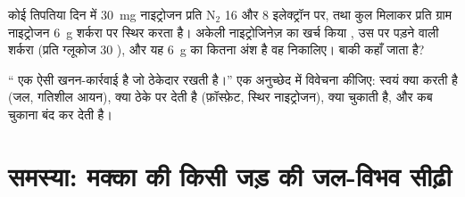 \begin{exercise}[$\star\star\star$]\label{exo:b1:plant-water-minerals:11}
कोई तिपतिया दिन में \qty{30}{mg} नाइट्रोजन प्रति $\mathrm{N_2}$
\qty{16}{}  और \qty{8}{} इलेक्ट्रॉन पर, तथा कुल मिलाकर प्रति ग्राम
नाइट्रोजन \qty{6}{g} शर्करा पर स्थिर करता है। अकेली नाइट्रोजिनेज़ का
खर्च किया , उस पर पड़ने वाली शर्करा (प्रति ग्लूकोज 30 ), और यह
\qty{6}{g} का कितना अंश है वह निकालिए। बाकी कहाँ जाता है?
\end{exercise}

\begin{exercise}[$\star\star\star$]\label{exo:b1:plant-water-minerals:12}
`` एक ऐसी खनन-कार्रवाई है जो ठेकेदार रखती है।'' एक अनुच्छेद में
विवेचना कीजिए:  स्वयं क्या करती है (जल, गतिशील आयन), क्या ठेके पर
देती है (फ़ॉस्फ़ेट, स्थिर नाइट्रोजन), क्या चुकाती है, और कब चुकाना बंद
कर देती है।
\end{exercise}

\section{समस्या: मक्का की किसी जड़ की जल-विभव सीढ़ी}

